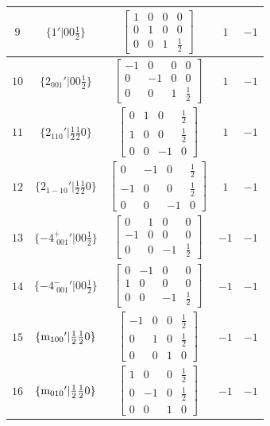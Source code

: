 \documentclass[fleqn,8pt]{jsarticle}
\begin{document}
\begin{longtable}{ccccc}
$ 9 $ & $ \{1{}'|0 0 \frac{1}{2}\} $ & $ \begin{bmatrix} 1 & 0 & 0 & 0 \\ 0 & 1 & 0 & 0 \\ 0 & 0 & 1 & \frac{1}{2} \end{bmatrix} $ & $ 1 $ & $ -1 $ \\ \hline
$ 10 $ & $ \{2{}_{001}{}'|0 0 \frac{1}{2}\} $ & $ \begin{bmatrix} -1 & 0 & 0 & 0 \\ 0 & -1 & 0 & 0 \\ 0 & 0 & 1 & \frac{1}{2} \end{bmatrix} $ & $ 1 $ & $ -1 $ \\ \hline
$ 11 $ & $ \{2{}_{110}{}'|\frac{1}{2} \frac{1}{2} 0\} $ & $ \begin{bmatrix} 0 & 1 & 0 & \frac{1}{2} \\ 1 & 0 & 0 & \frac{1}{2} \\ 0 & 0 & -1 & 0 \end{bmatrix} $ & $ 1 $ & $ -1 $ \\ \hline
$ 12 $ & $ \{2{}_{1-10}{}'|\frac{1}{2} \frac{1}{2} 0\} $ & $ \begin{bmatrix} 0 & -1 & 0 & \frac{1}{2} \\ -1 & 0 & 0 & \frac{1}{2} \\ 0 & 0 & -1 & 0 \end{bmatrix} $ & $ 1 $ & $ -1 $ \\ \hline
$ 13 $ & $ \{-4^{+}_{\,\,001}{}'|0 0 \frac{1}{2}\} $ & $ \begin{bmatrix} 0 & 1 & 0 & 0 \\ -1 & 0 & 0 & 0 \\ 0 & 0 & -1 & \frac{1}{2} \end{bmatrix} $ & $ -1 $ & $ -1 $ \\ \hline
$ 14 $ & $ \{-4^{-}_{\,\,001}{}'|0 0 \frac{1}{2}\} $ & $ \begin{bmatrix} 0 & -1 & 0 & 0 \\ 1 & 0 & 0 & 0 \\ 0 & 0 & -1 & \frac{1}{2} \end{bmatrix} $ & $ -1 $ & $ -1 $ \\ \hline
$ 15 $ & $ \{{\rm m}_{100}{}'|\frac{1}{2} \frac{1}{2} 0\} $ & $ \begin{bmatrix} -1 & 0 & 0 & \frac{1}{2} \\ 0 & 1 & 0 & \frac{1}{2} \\ 0 & 0 & 1 & 0 \end{bmatrix} $ & $ -1 $ & $ -1 $ \\ \hline
$ 16 $ & $ \{{\rm m}_{010}{}'|\frac{1}{2} \frac{1}{2} 0\} $ & $ \begin{bmatrix} 1 & 0 & 0 & \frac{1}{2} \\ 0 & -1 & 0 & \frac{1}{2} \\ 0 & 0 & 1 & 0 \end{bmatrix} $ & $ -1 $ & $ -1 $ \\
\end{longtable}
\end{document}
